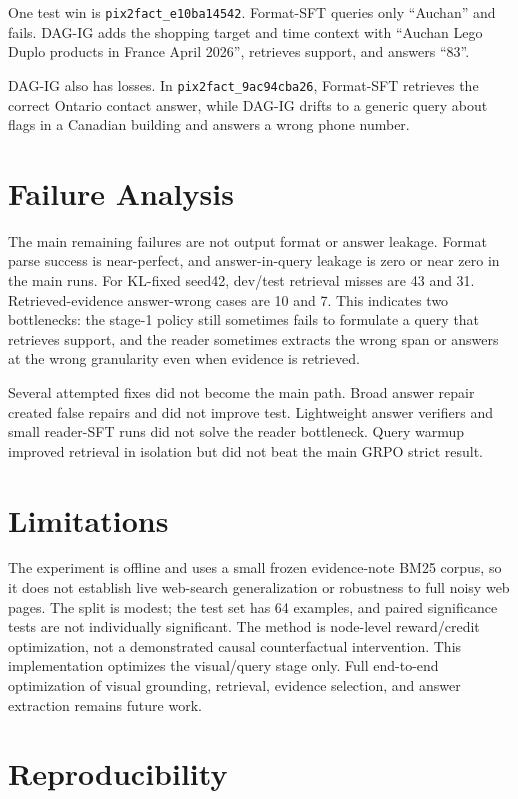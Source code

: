 \documentclass[11pt]{article}
\begin{document}
One test win is \texttt{pix2fact\_e10ba14542}. Format-SFT queries only ``Auchan'' and fails. DAG-IG adds the shopping target and time context with ``Auchan Lego Duplo products in France April 2026'', retrieves support, and answers ``83''.

DAG-IG also has losses. In \texttt{pix2fact\_9ac94cba26}, Format-SFT retrieves the correct Ontario contact answer, while DAG-IG drifts to a generic query about flags in a Canadian building and answers a wrong phone number.

\section{Failure Analysis}

The main remaining failures are not output format or answer leakage. Format parse success is near-perfect, and answer-in-query leakage is zero or near zero in the main runs. For KL-fixed seed42, dev/test retrieval misses are 43 and 31. Retrieved-evidence answer-wrong cases are 10 and 7. This indicates two bottlenecks: the stage-1 policy still sometimes fails to formulate a query that retrieves support, and the reader sometimes extracts the wrong span or answers at the wrong granularity even when evidence is retrieved.

Several attempted fixes did not become the main path. Broad answer repair created false repairs and did not improve test. Lightweight answer verifiers and small reader-SFT runs did not solve the reader bottleneck. Query warmup improved retrieval in isolation but did not beat the main GRPO strict result.

\section{Limitations}

The experiment is offline and uses a small frozen evidence-note BM25 corpus, so it does not establish live web-search generalization or robustness to full noisy web pages. The split is modest; the test set has 64 examples, and paired significance tests are not individually significant. The method is node-level reward/credit optimization, not a demonstrated causal counterfactual intervention. This implementation optimizes the visual/query stage only. Full end-to-end optimization of visual grounding, retrieval, evidence selection, and answer extraction remains future work.

\section{Reproducibility}
\end{document}
